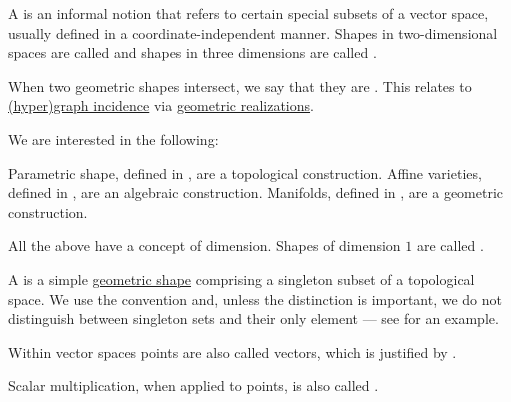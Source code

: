 \begin{definition}\label{def:geometric_shape}
  A  is an informal notion that refers to certain special subsets of a vector space, usually defined in a coordinate-independent manner. Shapes in two-dimensional spaces are called  and shapes in three dimensions are called .

  When two geometric shapes intersect, we say that they are . This relates to \hyperref[def:hypergraph/incidence]{(hyper)graph incidence} via \hyperref[def:quiver_geometric_realization]{geometric realizations}.

  We are interested in the following:
  \begin{thmenum}
     Parametric shape, defined in , are a topological construction.
     Affine varieties, defined in , are an algebraic construction.
     Manifolds, defined in , are a geometric construction.
  \end{thmenum}

  All the above have a concept of dimension. Shapes of dimension \( 1 \) are called .
\end{definition}

\begin{definition}\label{def:point}
  A  is a simple \hyperref[def:geometric_shape]{geometric shape} comprising a singleton subset of a topological space. We use the convention  and, unless the distinction is important, we do not distinguish between singleton sets and their only element --- see  for an example.

  Within vector spaces points are also called vectors, which is justified by .

  Scalar multiplication, when applied to points, is also called .
\end{definition}

